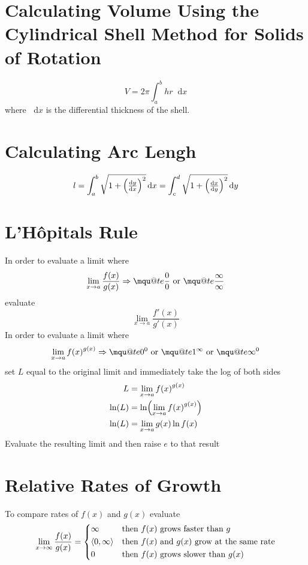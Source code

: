 \documentclass[12pt]{article}
\makeatletter
\DeclarePairedDelimiter\paren{(}{)}
\renewcommand*{\implies}{\Rightarrow}
\newcommand*{\D}[1]{\mathop{}\!\mathrm{d}#1}
\newcommand{\mquote}[1]{{\mathpalette\mqu@te{#1}}}
\newcommand{\mqu@te}[2]{%
  \sbox0{\(\m@th#1\text{``}\)}%
  \sbox1{\(\m@th#1\text{''}\)}%
  \sbox2{\(\m@th#1#2\)}%
  \ifdim\ht2>\ht0
    \raisebox{\dimexpr\ht2-\height}{\box0}%
    #2%
    \raisebox{\dimexpr\ht2-\height}{\box1}%
  \else
    \box0 #2\box1
  \fi
}
\newcommand*{\fixmath}{%
  \makebox{}\vspace{\glueexpr-\baselineskip-\abovedisplayskip}}
\newenvironment{fixaskip}{\setlength{\abovedisplayskip}{0pt}\fixmath%
  \ignorespaces}{\ignorespacesafterend}
\newenvironment{fixbskip}{\setlength{\belowdisplayskip}{0pt}\ignorespaces}%
  {\ignorespacesafterend}
\makeatother
\begin{document}
\section*{Calculating Volume Using the Cylindrical Shell Method for Solids of
Rotation}
\begin{fixaskip}
  \[
    V = 2\pi \int_a^b hr \D{x}
  \]
\end{fixaskip}
where \(\D{x}\) is the differential thickness of the shell.
\section*{Calculating Arc Lengh}
\begin{fixbskip}
  \[
    l = \int_a^b \sqrt{1+{\paren*{\dd[y]{x}}}^2} \D{x}
    = \int_c^d \sqrt{1+{\paren*{\dd[x]{y}}}^2} \D{y}
  \]
\end{fixbskip}
\section*{L'H\^{o}pitals Rule}
In order to evaluate a limit where
\[
  \lim_{x \to a} \frac{f(x)}{g(x)} \implies \mquote{\frac{0}{0}} \text{ or }
  \mquote{\frac{\infty}{\infty}}
\]
evaluate
\[
  \lim_{x \to a} \frac{f'(x)}{g'(x)}
\]
In order to evaluate a limit where
\[
  \lim_{x \to a} {f(x)}^{g(x)} \implies \mquote{0^0} \text{ or }
  \mquote{1^\infty} \text{ or } \mquote{\infty^0}
\]
set \(L\) equal to the original limit and immediately take the log of both
sides
\begin{align*}
  L &= \lim_{x \to a} {f(x)}^{g(x)}\\
  \ln(L) &= \ln\paren*{\lim_{x \to a} {f(x)}^{g(x)}}\\
  \ln(L) &= \lim_{x \to a} g(x) \ln f(x)
\end{align*}
Evaluate the resulting limit and then raise \(e\) to that result
\section*{Relative Rates of Growth}
To compare rates of \(f(x)\) and \(g(x)\) evaluate
\begin{fixbskip}
  \[
    \lim_{x \to \infty} \frac{f(x)}{g(x)} = \begin{dcases*}
      \infty & then \(f(x)\) grows faster than \(g\)\\
      \left<0, \infty\right> & then \(f(x)\) and \(g(x)\) grow at the same
        rate\\
      0 & then \(f(x)\) grows slower than \(g(x)\)
    \end{dcases*}
  \]
\end{fixbskip}
\end{document}
